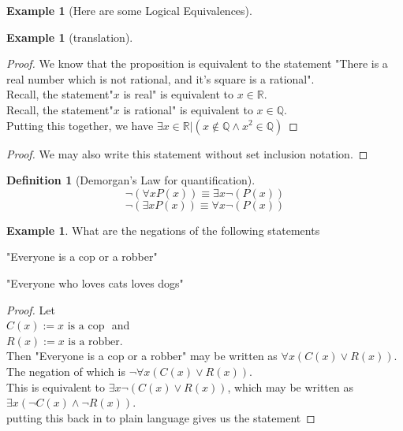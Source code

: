 \documentclass[letterpaper,10pt]{article}
\theoremstyle{plain}
\theoremstyle{definition}
\newtheorem{defn}[thm]{Definition}
\newtheorem{exmp}[thm]{Example}
\theoremstyle{remark}
\providecommand{\land}{\ensuremath{\wedge}}
\providecommand{\lor}{\ensuremath{\vee}}
\begin{document}
\begin{exmp}[Here are some Logical Equivalences]
\begin{exmp}[translation]
\begin{proof}
We know that the proposition is equivalent to the statement "There is a real number which is not rational, and it's square is a rational".
\\
Recall, the statement"$x$ is real" is equivalent to $x \in \mathbb{R}$.
\\
Recall, the statement"$x$ is rational" is equivalent to $x \in \mathbb{Q}$.
\\
Putting this together, we have
$\exists x \in \mathbb{R} |( x \notin \mathbb{Q} \land x^2 \in \mathbb{Q} )$
\end{proof}
\begin{proof}
We may also write this statement without set inclusion notation.



\end{proof}



\end{exmp}
\begin{defn}[Demorgan's Law for quantification]

\[\lnot (\forall x P(x)) \equiv \exists x \lnot( P(x))\]
\[\lnot (\exists x P(x)) \equiv \forall x \lnot( P(x))\]

\end{defn}
\begin{exmp}

What are the negations of the following statements

"Everyone is a cop or a robber"

"Everyone who loves cats loves dogs"
\end{exmp}
\begin{proof}
Let 
\\$C(x):=\text{$x$ is a cop }$ and
\\$R(x):=\text{$x$ is a robber}$.
\\Then "Everyone is a cop or a robber" may be written as $\forall x (C(x) \lor R(x))$.
The negation of which is $\lnot \forall x (C(x) \lor R(x))$.
\\ This is equivalent to $\exists x \lnot (C(x) \lor R(x))$, which may be written as $\exists x (\lnot C(x) \land \lnot R(x))$.
\\ putting this back in to plain language gives us the statement


\end{proof}
\end{exmp}
\end{document}
